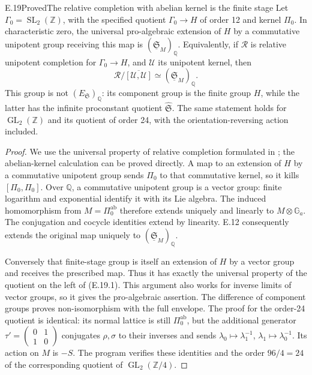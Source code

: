 \begin{statement}{E.19}{Proved}{The relative completion with abelian kernel is the finite stage}
Let \(\Gamma_0=\operatorname{SL}_2(\mathbb Z)\), with the specified
quotient \(\Gamma_0\to H\) of order 12 and kernel \(\Pi_0\).
In characteristic zero, the universal pro-algebraic extension
of \(H\) by a commutative unipotent group receiving this map is
\((\underline{\mathfrak S}_M)_{\mathbb Q}\).  Equivalently, if
\(\mathcal R\) is relative unipotent completion for
\(\Gamma_0\to H\), and \(\mathcal U\) its unipotent kernel, then
\[
       \mathcal R/\overline{[\mathcal U,\mathcal U]}
              \simeq (\underline{\mathfrak S}_M)_{\mathbb Q}.     \tag{E.19.1}
\]
This group is not \((E_{\mathfrak S})_{\mathbb Q}\): its component
group is the finite group \(H\), while the latter has the
infinite proconstant quotient \(\widehat{\mathfrak S}\).
The same statement holds for \(\operatorname{GL}_2(\mathbb Z)\)
and its quotient of order 24, with the orientation-reversing
action included.
\end{statement}
\begin{proof}
We use the universal property of relative completion formulated
in \citet[\S1, pp.~47--48]{E_Hain1998}; the abelian-kernel
calculation can be proved directly.  A map to an extension of
\(H\) by a commutative unipotent group sends \(\Pi_0\) to that
commutative kernel, so it kills \([\Pi_0,\Pi_0]\).  Over
\(\mathbb Q\), a commutative unipotent group is a vector group:
finite logarithm and exponential identify it with its Lie
algebra.  The induced homomorphism from
\(M=\Pi_0^{\mathrm{ab}}\) therefore extends uniquely and
linearly to \(M\otimes\mathbb G_a\).  The conjugation and
cocycle identities extend by linearity.  E.12 consequently
extends the original map uniquely to
\((\underline{\mathfrak S}_M)_{\mathbb Q}\).

Conversely that finite-stage group is itself an extension of
\(H\) by a vector group and receives the prescribed map.
Thus it has exactly the universal property of the quotient on
the left of (E.19.1).  This argument also works for inverse
limits of vector groups, so it gives the pro-algebraic assertion.
The difference of component groups proves non-isomorphism with
the full envelope.  The proof for the order-24 quotient is
identical: its normal lattice is still \(\Pi_0^{\mathrm{ab}}\),
but the additional generator
\(\tau'=\left(\begin{smallmatrix}0&1\\1&0\end{smallmatrix}\right)\)
conjugates \(\rho,\sigma\) to their inverses and sends
\(\lambda_0\mapsto\lambda_1^{-1}\),
\(\lambda_1\mapsto\lambda_0^{-1}\).  Its action on \(M\) is
\(-S\).  The program verifies these identities and the order
\(96/4=24\) of the corresponding quotient of
\(\operatorname{GL}_2(\mathbb Z/4)\).
\end{proof}

